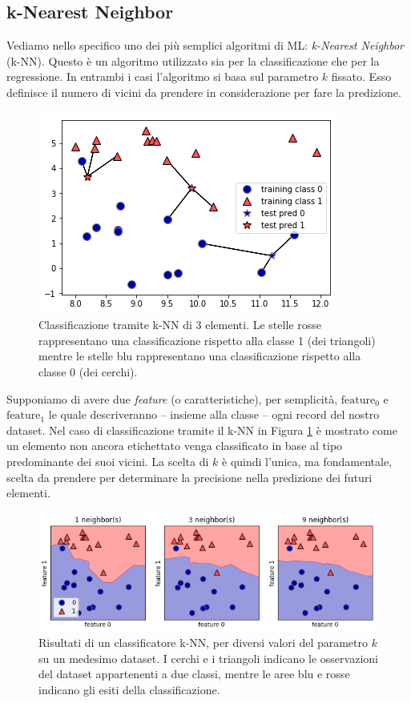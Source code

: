 \documentclass[12pt,italian]{report}
\begin{document}

\subsection{k-Nearest Neighbor}

Vediamo nello specifico uno dei più semplici algoritmi di ML: \emph{k-Nearest Neighbor} (k-NN). Questo è un algoritmo utilizzato sia per la classificazione che per la regressione. In entrambi i casi l'algoritmo si basa sul parametro $k$ fissato. Esso definisce il numero di vicini da prendere in considerazione per fare la predizione.


\begin{figure}[h!]
	\center
	\includegraphics[scale=0.7]{../img/knn_classifier}
	\caption{Classificazione tramite k-NN di 3 elementi. Le stelle rosse rappresentano una classificazione rispetto alla classe 1 (dei triangoli) mentre le stelle blu rappresentano una classificazione rispetto alla classe 0 (dei cerchi).}
	\label{fig:knn_classifier}
\end{figure}

Supponiamo di avere due \emph{feature} (o caratteristiche), per semplicità, $ \mathrm{feature_0} $  e $ \mathrm{feature_1} $ le quale descriveranno -- insieme alla classe -- ogni record del nostro dataset.  Nel caso di classificazione tramite il k-NN in Figura \ref{fig:knn_classifier} è mostrato come un elemento non ancora etichettato venga classificato in base al tipo predominante dei suoi vicini. La scelta di $ k $ è quindi l'unica, ma fondamentale, scelta da prendere per determinare la precisione nella predizione dei futuri elementi.

\begin{figure}[h!]
	\center
	\includegraphics[scale=0.55]{../img/knn_comparison}
	\caption{Risultati di un classificatore k-NN, per diversi valori del parametro $k$ su un medesimo dataset. I cerchi e i triangoli indicano le osservazioni del dataset appartenenti a due classi, mentre le aree blu e rosse indicano gli esiti della classificazione.}
	\label{fig:knn_difference}
\end{figure}
\end{document}
